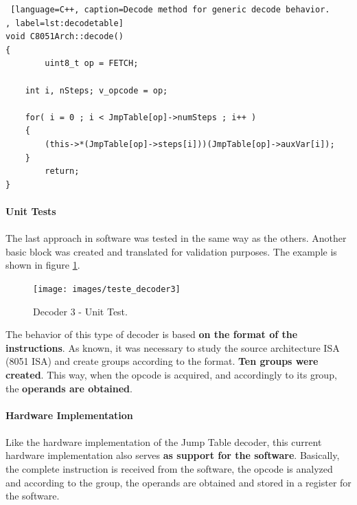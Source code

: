 \begin{lstlisting} [language=C++, caption=Decode method for generic decode behavior.
, label=lst:decodetable]
void C8051Arch::decode()
{
		uint8_t op = FETCH;

    int i, nSteps; v_opcode = op;

    for( i = 0 ; i < JmpTable[op]->numSteps ; i++ )
    {
    	(this->*(JmpTable[op]->steps[i]))(JmpTable[op]->auxVar[i]);
    }      
		return;
}
\end{lstlisting}

\newpage
\paragraph{Unit Tests}

\paragraph{}

The last approach in software was tested in the same way as the others. Another basic block was created and translated for validation purposes. The example is shown in figure \ref{fig:teste1_decoder3}.


\begin{figure}[H]
\centerline{
\texttt{[image: images/teste\_decoder3]}
}
\caption{Decoder 3 - Unit Test.}
\label{fig:teste1_decoder3} 
\end{figure}



The behavior of this type of decoder is based \textbf{on the format of the instructions}. As known, it was necessary to study the source architecture ISA (8051 ISA) and create groups according to the format. \textbf{Ten groups were created}. This way, when the opcode is acquired, and accordingly to its group, the \textbf{operands are obtained}. 

\paragraph{Hardware Implementation}

\paragraph{}

Like the hardware implementation of the Jump Table decoder, this current hardware implementation also serves \textbf{as support for the software}. Basically, the complete instruction is received from the software, the opcode is analyzed and according to the group, the operands are obtained and stored in a register for the software.

